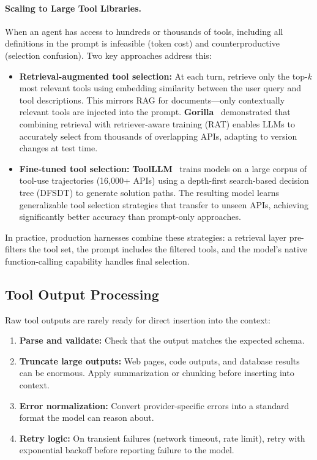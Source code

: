 \paragraph{Scaling to Large Tool Libraries.}
\label{scaling-to-large-tool-libraries.}

When an agent has access to hundreds or thousands of tools, including all definitions in the prompt is infeasible (token cost) and counterproductive (selection confusion). Two key approaches address this:

\begin{itemize}
  \item \textbf{Retrieval-augmented tool selection:} At each turn, retrieve only the top-$k$ most relevant tools using embedding similarity between the user query and tool descriptions. This mirrors RAG for documents---only contextually relevant tools are injected into the prompt. \textbf{Gorilla}~\cite{patil2023gorilla} demonstrated that combining retrieval with retriever-aware training (RAT) enables LLMs to accurately select from thousands of overlapping APIs, adapting to version changes at test time.
  \item \textbf{Fine-tuned tool selection:} \textbf{ToolLLM}~\cite{qin2024toolllm} trains models on a large corpus of tool-use trajectories (16,000+ APIs) using a depth-first search-based decision tree (DFSDT) to generate solution paths. The resulting model learns generalizable tool selection strategies that transfer to unseen APIs, achieving significantly better accuracy than prompt-only approaches.
\end{itemize}

In practice, production harnesses combine these strategies: a retrieval layer pre-filters the tool set, the prompt includes the filtered tools, and the model’s native function-calling capability handles final selection.

\subsection{Tool Output Processing}
\label{tool-output-processing}

Raw tool outputs are rarely ready for direct insertion into the context:

\begin{enumerate}
  \item \textbf{Parse and validate:} Check that the output matches the expected schema.
  \item \textbf{Truncate large outputs:} Web pages, code outputs, and database results can be enormous. Apply summarization or chunking before inserting into context.
  \item \textbf{Error normalization:} Convert provider-specific errors into a standard format the model can reason about.
  \item \textbf{Retry logic:} On transient failures (network timeout, rate limit), retry with exponential backoff before reporting failure to the model.
\end{enumerate}


